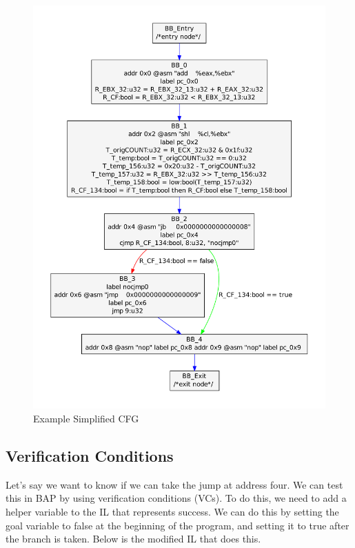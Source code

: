 \begin{figure}[p]
  \begin{center}
    \includegraphics[height=.9\textheight]{chap-examples/ssasimpcfg.pdf}
  \end{center}
  \caption{Example Simplified CFG}
  \label{fig:cfgsimp}
\end{figure}
\FloatBarrier

\subsection{Verification Conditions}

Let's say we want to know if we can take the jump at address four.  We
can test this in BAP by using verification conditions (VCs).  To do
this, we need to add a helper variable to the IL that represents
success.  We can do this by setting the goal variable to false at the
beginning of the program, and setting it to true after the branch is
taken.  Below is the modified IL that does this.

